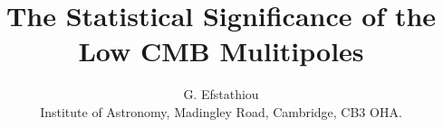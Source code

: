 %






\setcounter{parentequation}{0}
\def\beglet{
  \addtocounter{equation}{1}%
  \setcounter{parentequation}{\value{equation}}%
  \setcounter{equation}{0}%
  \def\theequation{\arabic{parentequation}\alph{equation}}%
  \ignorespaces
}
\def\endlet{
  \setcounter{equation}{\value{parentequation}}%
  \def\theequation{\arabic{equation}}%
}
\def\begletA{
  \addtocounter{equation}{1}%
  \setcounter{parentequation}{\value{equation}}%
  \setcounter{equation}{0}%
  \def\theequation{A\arabic{parentequation}\alph{equation}}%
  \ignorespaces
}
\def\endletA{
  \setcounter{equation}{\value{parentequation}}%
  \def\theequation{\arabic{equation}}%
}
\def\begletB{
  \addtocounter{equation}{1}%
  \setcounter{parentequation}{\value{equation}}%
  \setcounter{equation}{0}%
  \def\theequation{B\arabic{parentequation}\alph{equation}}%
  \ignorespaces
}
\def\begletC{
  \addtocounter{equation}{1}%
  \setcounter{parentequation}{\value{equation}}%
  \setcounter{equation}{0}%
  \def\theequation{B\arabic{parentequation}}%
  \ignorespaces
}
\def\endletB{
  \setcounter{equation}{\value{parentequation}}%
  \def\theequation{\arabic{equation}}%
}
\def\ltsima{$\; \buildrel < \over \sim \;$}
\def\gtsima{$\; \buildrel > \over \sim \;$}
\def\simlt{\lower.5ex\hbox{\ltsima}}
\def\simgt{\lower.5ex\hbox{\gtsima}}
\def\kms{{\rm kms}^{-1}}
\def\hmpc{h^{-1} {\rm Mpc}}
\def\etal{{\it et al.}\rm}
\def\etals{{\it et al. }\rm}
\def\mk2{\mu {\rm K}^2}






\title[Statistics of CMB Quadrupole]
{The Statistical Significance of the  Low CMB Mulitipoles}



\author[G. Efstathiou]{G. Efstathiou\\
Institute of Astronomy, Madingley Road, Cambridge, CB3 OHA.}


\maketitle

